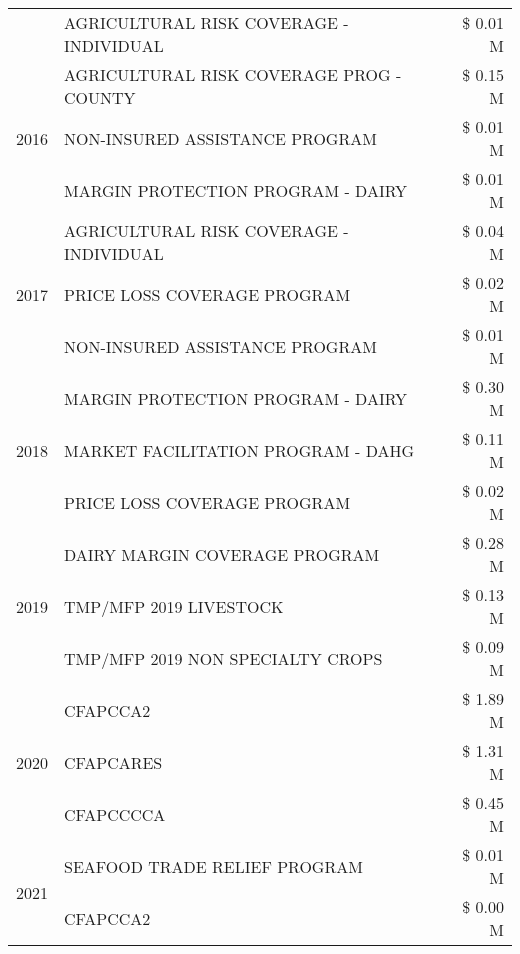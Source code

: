 \begin{tabular}{llr}
 & AGRICULTURAL RISK COVERAGE - INDIVIDUAL & \$ 0.01 M \\
\cline{1-3}
\multirow[t]{3}{*}{2016} & AGRICULTURAL RISK COVERAGE PROG - COUNTY      & \$ 0.15 M \\
 & NON-INSURED ASSISTANCE PROGRAM                & \$ 0.01 M \\
 & MARGIN PROTECTION PROGRAM - DAIRY             & \$ 0.01 M \\
\cline{1-3}
\multirow[t]{3}{*}{2017} & AGRICULTURAL RISK COVERAGE - INDIVIDUAL & \$ 0.04 M \\
 & PRICE LOSS COVERAGE PROGRAM & \$ 0.02 M \\
 & NON-INSURED ASSISTANCE PROGRAM & \$ 0.01 M \\
\cline{1-3}
\multirow[t]{3}{*}{2018} & MARGIN PROTECTION PROGRAM - DAIRY & \$ 0.30 M \\
 & MARKET FACILITATION PROGRAM - DAHG & \$ 0.11 M \\
 & PRICE LOSS COVERAGE PROGRAM & \$ 0.02 M \\
\cline{1-3}
\multirow[t]{3}{*}{2019} & DAIRY MARGIN COVERAGE PROGRAM & \$ 0.28 M \\
 & TMP/MFP 2019 LIVESTOCK & \$ 0.13 M \\
 & TMP/MFP 2019 NON SPECIALTY CROPS & \$ 0.09 M \\
\cline{1-3}
\multirow[t]{3}{*}{2020} & CFAPCCA2 & \$ 1.89 M \\
 & CFAPCARES & \$ 1.31 M \\
 & CFAPCCCCA & \$ 0.45 M \\
\cline{1-3}
\multirow[t]{2}{*}{2021} & SEAFOOD TRADE RELIEF PROGRAM & \$ 0.01 M \\
 & CFAPCCA2 & \$ 0.00 M \\
\cline{1-3}
\bottomrule
\end{tabular}
